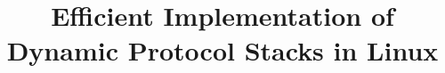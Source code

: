 \documentclass{sig-alternate}
\begin{document}
%

\title{Efficient Implementation of Dynamic Protocol Stacks in Linux}
%
%
%
%
%
\end{document}
